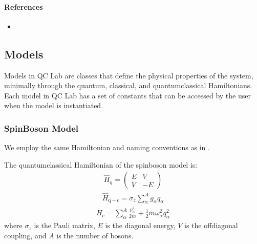 \documentclass[letterpaper,10pt,english]{sphinxmanual}
\begin{document}
\paragraph{References}
\label{\detokenize{user_guide/drivers/parallel_driver_mpi:references}}\begin{itemize}
\item {} 
\sphinxAtStartPar
{}

\end{itemize}

\sphinxstepscope


\subsection{Models}
\label{\detokenize{user_guide/models/models:models}}\label{\detokenize{user_guide/models/models:id1}}\label{\detokenize{user_guide/models/models::doc}}
\sphinxAtStartPar
Models in QC Lab are classes that define the physical properties of the system, minimally through the quantum, classical, and quantum\sphinxhyphen{}classical
Hamiltonians. Each model in QC Lab
has a set of constants that can be accessed by the user when the model is instantiated.

\sphinxstepscope


\subsubsection{Spin\sphinxhyphen{}Boson Model}
\label{\detokenize{user_guide/models/spin_boson_model:spin-boson-model}}\label{\detokenize{user_guide/models/spin_boson_model:id1}}\label{\detokenize{user_guide/models/spin_boson_model::doc}}
\sphinxAtStartPar
We employ the same Hamiltonian and naming conventions as in .

\sphinxAtStartPar
The quantum\sphinxhyphen{}classical Hamiltonian of the spin\sphinxhyphen{}boson model is:
\begin{equation*}
\begin{split}\hat{H}_{\mathrm{q}} = \left(\begin{array}{cc} E & V \\ V & -E \end{array}\right)\end{split}
\end{equation*}\begin{equation*}
\begin{split}\hat{H}_{\mathrm{q-c}} = \sigma_{z} \sum_{\alpha}^{A}  g_{\alpha}q_{\alpha}\end{split}
\end{equation*}\begin{equation*}
\begin{split}H_{\mathrm{c}} = \sum_{\alpha}^{A} \frac{p_{\alpha}^{2}}{2m} + \frac{1}{2}m\omega_{\alpha}^{2}q_{\alpha}^{2}\end{split}
\end{equation*}
\sphinxAtStartPar
where \(\sigma_{z}\) is the Pauli matrix, \(E\) is the diagonal energy, \(V\) is the off\sphinxhyphen{}diagonal coupling, and \(A\) is the number of bosons.
\end{document}
